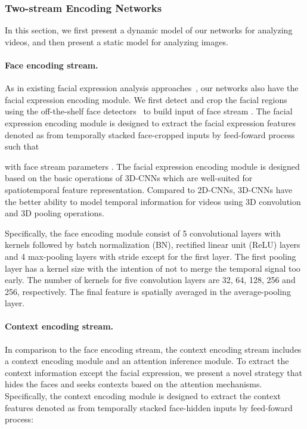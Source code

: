 \documentclass[10pt,twocolumn,letterpaper]{article}
\begin{document}
\subsubsection{Two-stream Encoding Networks}\vspace{-5pt}
In this section, we first present a dynamic model of our networks for analyzing videos, and then present a static model for analyzing images.\vspace{-10pt}

\paragraph{Face encoding stream.}
As in existing facial expression analysis approaches~\cite{fabian2016emotionet,lee2018spatiotemporal, fan2018video}, our networks also have the facial expression encoding module. We first detect and crop the facial regions using the off-the-shelf face detectors~\cite{king2009dlib} to build input of face stream . The facial expression encoding module is designed to extract the facial expression features denoted as  from temporally stacked face-cropped inputs  by feed-foward process such that

with face stream parameters .
The facial expression encoding module is designed based on the basic operations of 3D-CNNs which are well-suited for spatiotemporal feature representation.
Compared to 2D-CNNs, 3D-CNNs have the better ability to model temporal information for videos using 3D convolution and 3D pooling operations.

Specifically, the face encoding module consist of 5 convolutional layers with  kernels followed by batch normalization (BN), rectified linear unit (ReLU) layers and 4 max-pooling layers with stride  except for the first layer.
The first pooling layer has a kernel size  with the intention of not to merge the temporal signal too early.
The number of kernels for five convolution layers are 32, 64, 128, 256 and 256, respectively.
The final feature  is spatially averaged in the average-pooling layer.\vspace{-10pt}



\paragraph{Context encoding stream.}
In comparison to the face encoding stream, the context encoding stream includes a context encoding module and an attention inference module.
To extract the context information except the facial expression, we present a novel strategy that hides the faces and seeks contexts based on the attention mechanisms.
Specifically, the context encoding module is designed to extract the context features denoted as  from temporally stacked face-hidden inputs  by feed-foward process:
\end{document}
